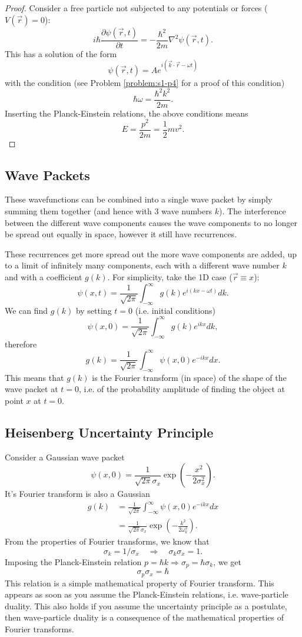 \documentclass{article}
\begin{document}
\begin{proof}
    Consider a free particle not subjected to any potentials or forces ($V(\vec{r})=0$):
    \[
        i\hbar \frac{\partial \psi (\vec{r},t)}{\partial t}=-\frac{\hbar^2}{2m}\nabla^2\psi (\vec{r},t).
    \]
    This has a solution of the form
    \[
        \psi (\vec{r},t)=Ae^{i(\vec{k}\cdot\vec{r}-\omega t)}
    \]
    with the condition (see Problem \ref{problem:s1-p4} for a proof of this condition)
    \[
        \hbar \omega =\frac{\hbar^2k^2}{2m}.
    \]
    Inserting the Planck-Einstein relations, the above conditions means
    \[
        E=\frac{p^2}{2m}=\frac{1}{2}mv^2.
    \]
\end{proof}

\subsection{Wave Packets}
These wavefunctions can be combined into a single wave packet by simply summing them together (and hence with 3 wave numbers $k$). The interference between the different wave components causes the wave components to no longer be spread out equally in space, however it still have recurrences.

These recurrences get more spread out the more wave components are added, up to a limit of infinitely many components, each with a different wave number $k$ and with a coefficient $g(k)$. For simplicity, take the 1D case ($\vec{r}\equiv x$):
\[
    \psi (x,t)=\frac{1}{\sqrt{2\pi }}\int_{-\infty}^\infty g(k)e^{i(kx-\omega t)}dk.
\]
We can find $g(k)$ by setting $t=0$ (i.e. initial conditions)
\[
    \psi (x,0)=\frac{1}{\sqrt{2\pi }}\int_{-\infty}^\infty g(k)e^{ikx}dk,
\]
therefore
\[
    g(k)=\frac{1}{\sqrt{2\pi }}\int_{-\infty}^\infty\psi (x,0)e^{-ikx}dx.
\]
This means that $g(k)$ is the Fourier transform (in space) of the shape of the wave packet at $t=0$, i.e. of the probability amplitude of finding the object at point $x$ at $t=0$.

\subsection{Heisenberg Uncertainty Principle}
Consider a Gaussian wave packet
\[
    \psi (x,0)=\frac{1}{\sqrt{2\pi }\sigma _x}\exp \left( -\frac{x^2}{2\sigma _x^2} \right). 
\]
It's Fourier transform is also a Gaussian
\begin{align*}
    g(k) &= \frac{1}{\sqrt{2\pi }}\int_{-\infty}^\infty\psi (x,0)e^{-ikx}dx \\
         &=\frac{1}{\sqrt{2\pi }\sigma _x}\exp \left( -\frac{k^2}{2\omega _k^2} \right).
\end{align*}
From the properties of Fourier transforms, we know that
\[
    \sigma _k=1/\sigma _x\quad\Rightarrow\quad\sigma _k\sigma _x=1.
\]
Imposing the Planck-Einstein relation $p=\hbar k\Rightarrow\sigma _p=\hbar\sigma _k$, we get
\[
    \boxed{\sigma _p\sigma _x=\hbar }
\]
This relation is a simple mathematical property of Fourier transform. This appears as soon as you assume the Planck-Einstein relations, i.e. wave-particle duality. This also holds if you assume the uncertainty principle as a postulate, then wave-particle duality is a consequence of the mathematical properties of Fourier transforms.
\end{document}
